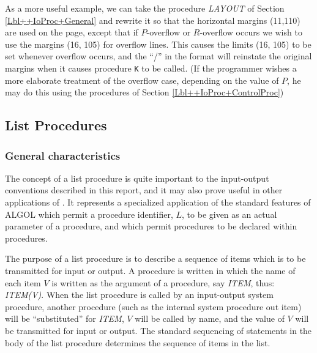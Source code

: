 \documentclass[a4paper,11pt]{article}
\begin{document}
As a more useful example, we can take the procedure {\it LAYOUT} of
Section \ref{Lbl++IoProc+General} and rewrite it so that the
horizontal margins (11,110) are used on the page, except that if
$P$-overflow or $R$-overflow occurs we wish to use the margins (16,
105) for overflow lines.
\noindent{}This causes the limits (16, 105) to be set whenever
overflow occurs, and the ``/'' in the format will reinstate the
original margins when it causes procedure {\tt K} to be called.  (If
the programmer wishes a more elaborate treatment of the overflow case,
depending on the value of $P$, he may do this using the procedures of
Section \ref{Lbl++IoProc+ControlProc})

\subsection{List Procedures}
\label{Lbl++IoProc+ListProc}

\subsubsection{General characteristics}
\label{Lbl++IoProc+ListProc+General}

The concept of a list procedure is quite important to the input-output
conventions described in this report, and it may also prove useful in
other applications of \Algol.  It represents a specialized application
of the standard features of ALGOL which permit a procedure identifier,
$L$, to be given as an actual parameter of a procedure, and which
permit procedures to be declared within procedures.

The purpose of a list procedure is to describe a sequence of items
which is to be transmitted for input or output.  A procedure is
written in which the name of each item $V$ is written as the argument
of a procedure, say {\it ITEM}, thus: {\it ITEM(V)}.  When the list
procedure is called by an input-output system procedure, another
procedure (such as the internal system procedure out item) will be
``substituted'' for {\it ITEM}, $V$ will be called by name, and the
value of $V$ will be transmitted for input or output. The standard
sequencing of \Algol statements in the body of the list procedure
determines the sequence of items in the list.
\end{document}
